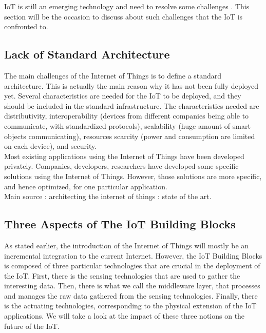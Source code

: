 IoT is still an emerging technology and need to resolve some challenges \cite{website:iot_challenge}. This section will be the occasion to discuss about such challenges that the IoT is confronted to.

\subsection{Lack of Standard Architecture}

The main challenges of the Internet of Things is to define a standard architecture. This is actually the main reason why it has not been fully deployed yet. Several characteristics are needed for the IoT to be deployed, and they should be included in the standard infrastructure. The characteristics needed are distributivity, interoperability (devices from different companies being able to communicate, with standardized protocols), scalability (huge amount of smart objects communicating), resources scarcity (power and consumption are limited on each device), and security.\\

Most existing applications using the Internet of Things have been developed privately. Companies, developers, researchers have developed some specific solutions using the Internet of Things. However, those solutions are more specific, and hence optimized, for one particular application.\\

Main source : architecting the internet of things : state of the art.\\

\subsection{Three Aspects of The IoT Building Blocks}

As stated earlier, the introduction of the Internet of Things will mostly be an incremental integration to the current Internet. However, the IoT Building Blocks is composed of three particular technologies that are crucial in the deployment of the IoT. First, there is the sensing technologies that are used to gather the interesting data. Then, there is what we call the middleware layer, that processes and manages the raw data gathered from the sensing technologies. Finally, there is the actuating technologies, corresponding to the physical extension of the IoT applications. We will take a look at the impact of these three notions on the future of the IoT.\\

